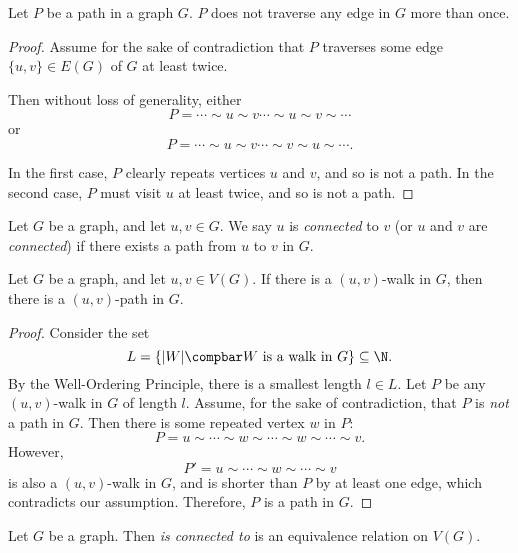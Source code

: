 \documentclass[12pt]{article}
\begin{document}
\begin{prop}
    Let $P$ be a path in a graph $G$. $P$ does not traverse any edge in $G$ more than once.
\end{prop}

\begin{proof}
    Assume for the sake of contradiction that $P$ traverses some edge $\{u, v\} \in E(G)$ of $G$ at least twice.

    Then without loss of generality, either \[P = \cdots \sim u \sim v \cdots \sim u \sim v \sim \cdots\] or \[P = \cdots \sim u \sim v \cdots \sim v \sim u \sim \cdots.\]

    In the first case, $P$ clearly repeats vertices $u$ and $v$, and so is not a path. In the second case, $P$ must visit $u$ at least twice, and so is not a path.
\end{proof}

\begin{defn}
    Let $G$ be a graph, and let $u, v \in G$. We say $u$ is \emph{connected} to $v$ (or $u$ and $v$ are \emph{connected}) if there exists a path from $u$ to $v$ in $G$.
\end{defn}

\begin{lemma}\label{walk-implies-path}
    Let $G$ be a graph, and let $u, v \in V(G)$. If there is a $(u, v)$-walk in $G$, then there is a $(u, v)$-path in $G$.
\end{lemma}

\begin{proof}
    Consider the set \[L = \left\{|W| \compbar W \textrm{ is a walk in } G\right\} \subseteq \N.\] By the Well-Ordering Principle, there is a smallest length $l \in L$. Let $P$ be any $(u,v)$-walk in $G$ of length $l$. Assume, for the sake of contradiction, that $P$ is \emph{not} a path in $G$. Then there is some repeated vertex $w$ in $P$: \[P = u \sim \cdots \sim w \sim \cdots \sim w \sim \cdots \sim v.\] However, \[P' = u \sim \cdots \sim w \sim \cdots \sim v\] is also a $(u, v)$-walk in $G$, and is shorter than $P$ by at least one edge, which contradicts our assumption. Therefore, $P$ is a path in $G$.
\end{proof}

\begin{prop}
    Let $G$ be a graph. Then \emph{is connected to} is an equivalence relation on $V(G)$.
\end{prop}
\end{document}
